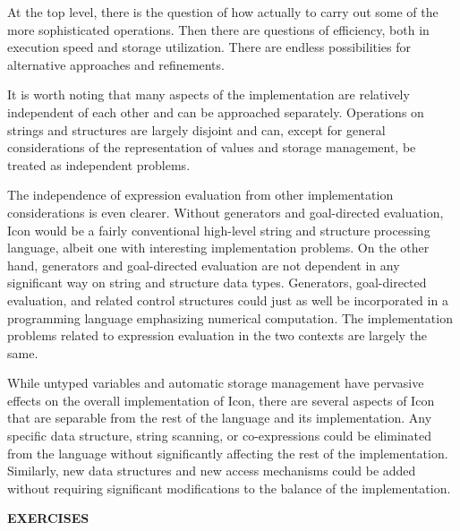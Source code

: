 At the top level, there is the question of how actually to carry out
some of the more sophisticated operations. Then there are questions of
efficiency, both in execution speed and storage utilization. There are
endless possibilities for alternative approaches and refinements.

It is worth noting that many aspects of the implementation are
relatively independent of each other and can be approached
separately. Operations on strings and structures are largely disjoint
and can, except for general considerations of the representation of
values and storage management, be treated as independent problems.

The independence of expression evaluation from other implementation
considerations is even clearer. Without generators and goal-directed
evaluation, Icon would be a fairly conventional high-level string and
structure processing language, albeit one with interesting
implementation problems. On the other hand, generators and
goal-directed evaluation are not dependent in any significant way on
string and structure data types. Generators, goal-directed evaluation,
and related control structures could just as well be incorporated in a
programming language emphasizing numerical computation. The
implementation problems related to expression evaluation in the two
contexts are largely the same.

While untyped variables and automatic storage management have
pervasive effects on the overall implementation of Icon, there are
several aspects of Icon that are separable from the rest of the
language and its implementation. Any specific data structure, string
scanning, or co-expressions could be eliminated from the language
without significantly affecting the rest of the
implementation. Similarly, new data structures and new access
mechanisms could be added without requiring significant modifications
to the balance of the implementation.

{\sffamily\bfseries
EXERCISES}

